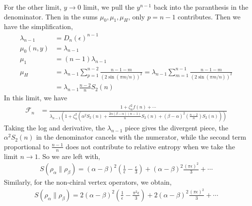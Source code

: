 \documentclass[11pt]{article}
\newcommand{\ep}{\epsilon}
\newcommand{\lb}{\left(}
\newcommand{\rb}{\right)}
\begin{document}
For the other limit, $y \to 0$ limit, we pull the $y^{n-1}$ back into the paranthesis in the denominator. Then in the sums $\mu_0,\mu_1,\mu_H$, only $p = n-1$ contributes. Then we have the simplification,
\begin{align}
    \lambda_{n-1}  &= D_n(\ep)^{n-1} \\
    \mu_0(n,y) &= \lambda_{n-1} \\
    \mu_1 & = (n-1)\lambda_{n-1}\\
    \mu_H &= \lambda_{n-1} \sum_{p=1}^{n-2} \frac{n-1-m}{(2\sin(\pi m /n))^2} = \lambda_{n-1} \sum_{m=1}^{n-1}\frac{n-1-m}{(2\sin(\pi m/n))^2} \\
    &= \lambda_{n-1} \frac{n-2}{n}S_2(n) 
\end{align}
In this limit, we have
\begin{align}
    \mathcal{F}_n &= \frac{1 + \zeta_n^2 f(n)+\cdots}{  \lambda_{n-1} \lb 1 + \zeta_n^2 \lb \alpha^2 S_2(n) + \frac{2\alpha (\beta - \alpha)(n-1)}{n}S_2(n) + (\beta-\alpha)^2  \lb\frac{n-2}{n}\rb S_2(n)\rb\rb } 
\end{align}
Taking the log and derivative, the $\lambda_{n-1}$ piece gives the divergent piece, the $\alpha^2S_2(n)$ in the denominator cancels with the numerator, while the second term proportional to $\frac{n-1}{n}$ does not contribute to relative entropy when we take the limit $n\to 1$. So we are left with,
\begin{align}
    S(\rho_\alpha \| \rho_\beta) = (\alpha - \beta)^2 \lb \frac{1}{\ep} - \frac{\ep}{3}\rb + (\alpha - \beta)^2 \frac{(\pi \ep)^2}{3}+\cdots
\end{align}
Similarly, for the non-chiral vertex operators, we obtain,
\begin{align}
    S(\rho_\alpha \| \rho_\beta) = 2(\alpha - \beta)^2 \lb \frac{1}{\ep} - \frac{\pi^2\ep}{3}\rb + 2(\alpha - \beta)^2 \frac{(\pi \ep)^2}{3}+\cdots
\end{align}
\end{document}
